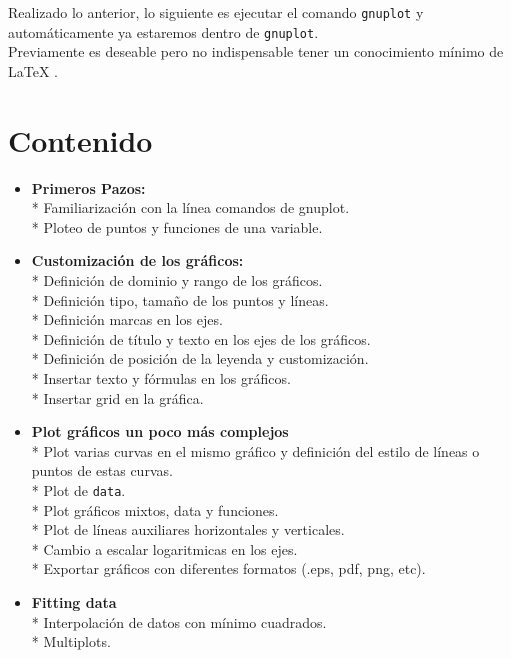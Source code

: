 \documentclass[11.5pt,a4paper]{article}
\begin{document}
Realizado lo anterior, lo siguiente es ejecutar el comando \texttt{gnuplot} y automáticamente ya estaremos dentro de \texttt{gnuplot}.\\

Previamente es deseable pero no indispensable tener un conocimiento mínimo de LaTeX .



\newpage
\section{Contenido}

\begin{itemize}
\item \textbf{Primeros Pazos:}\\* 
Familiarización con la línea comandos de gnuplot.\\*
Ploteo de puntos y funciones de una variable.

\item \textbf{Customización de los gráficos:}\\*
Definición de dominio y rango de los gráficos.\\*
Definición tipo, tamaño de los puntos y líneas.\\*
Definición marcas en los ejes.\\*
Definición de título y texto en los ejes de los gráficos.\\*
Definición de posición de la leyenda y customización.\\*
Insertar texto y fórmulas en los gráficos.\\*
Insertar grid en la gráfica.

\item \textbf{Plot gráficos un poco más complejos}\\*
Plot varias curvas en el mismo gráfico y definición del estilo de líneas o puntos de estas curvas.\\*
Plot de \texttt{data}.\\*
Plot gráficos mixtos, data y funciones.\\*
Plot de líneas auxiliares horizontales y verticales.\\*
Cambio a escalar logaritmicas en los ejes.\\*
Exportar gráficos con diferentes formatos (.eps, pdf, png, etc).

\item \textbf{Fitting data}\\*
Interpolación de datos con mínimo cuadrados.\\*
Multiplots.


\end{itemize}
\end{document}
